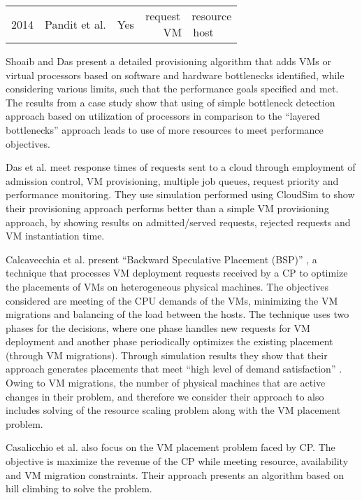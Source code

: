 \documentclass[10pt,journal,cspaper,compsoc]{IEEEtran}
\begin{document}
\begin{table*}
\begin{tabular}{|l|l|c|c|}
2014 & Pandit et al. \cite{2014_ResourceAllocSimAnnealing} & Yes & \parbox[t]{10cm}{\centering request~~resource \\ VM~~host \strut}\\ \hline

\end{tabular}
\end{table*}

Shoaib and Das \cite{2012_ucc2012YasDas} present a detailed provisioning algorithm that adds VMs or virtual processors based on software and hardware bottlenecks identified, while considering various limits, such that the performance goals specified and met. The results from a case study show that using of simple bottleneck detection approach based on utilization of processors in comparison to the ``layered bottlenecks'' \cite{franks2006layeredBottlenecks26} approach leads to use of more resources to meet performance objectives.

Das et al. \cite{2013_AKDas_IntelligentApproachVMProvisioning} meet response times of requests sent to a cloud through employment of admission control, VM provisioning, multiple job queues, request priority and performance monitoring. They use simulation performed using CloudSim \cite{2011_CloudSimAToolkit} to show their provisioning approach performs better than a simple VM provisioning approach, by showing results on admitted/served requests, rejected requests and VM instantiation time.

Calcavecchia et al. \cite{2012_VMPlacementStratCloud} present ``Backward Speculative Placement (BSP)'' \cite{2012_VMPlacementStratCloud}, a technique that processes VM deployment requests received by a CP to optimize the placements of VMs on heterogeneous physical machines. The objectives considered are meeting of the CPU demands of the VMs, minimizing the VM migrations and balancing of the load between the hosts. The technique uses two phases for the decisions, where one phase handles new requests for VM deployment and another phase periodically optimizes the existing placement (through VM migrations). Through simulation results they show that their approach generates placements that meet ``high level of demand satisfaction'' \cite{2012_VMPlacementStratCloud}. Owing to VM migrations, the number of physical machines that are active changes in their problem, and therefore we consider their approach to also includes solving of the resource scaling problem along with the VM placement problem.

Casalicchio et al. \cite{2013_Casalicchio_AutoResProv} also focus on the VM placement problem faced by CP. The objective is maximize the revenue of the CP while meeting resource, availability and VM migration constraints. Their approach presents an algorithm based on hill climbing to solve the problem.
\end{document}
